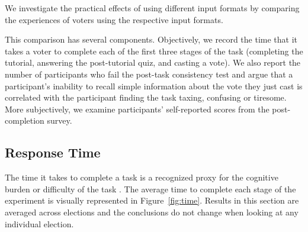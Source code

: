 \documentclass[letterpaper]{article} %
\newcommand{\kibitz}[2]{\ifnum\Comments=1{\color{#1}{#2}}\fi}
\newcommand{\gb}[1]{\kibitz{brown}{[GB:#1]}}
\begin{document}
We investigate the practical effects of using different input formats by comparing  the experiences of voters using the respective input formats.

This comparison has several components. Objectively, we record the time that it takes a voter to complete each of the first three stages of the task (completing the tutorial, answering the post-tutorial quiz, and casting a vote). %
We also report the number  of participants who fail the post-task consistency test and argue that a participant's inability  to recall simple information about the vote they just cast is correlated with the participant finding the task taxing, confusing or tiresome. 
More subjectively, we examine participants' self-reported scores from the post-completion survey. 


 


\subsection{Response Time}
The time it takes to complete a task is a recognized  proxy for  the cognitive burden  or difficulty of the task  \cite{rauterberg1992method}.  
%
The average time to complete each stage of the experiment is visually represented in  Figure~\ref{fig:time}.  Results in this section are averaged across elections and the conclusions do not change when looking at any individual election. %
\end{document}
